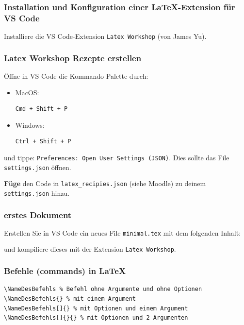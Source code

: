 \begin{frame}[fragile]
	\frametitle{Installation und Konfiguration einer \LaTeX-Extension für VS Code}
	Installiere die VS Code-Extension \texttt{Latex Workshop} (von James Yu).
\end{frame}

\begin{frame}[fragile]
	\frametitle{Latex Workshop Rezepte erstellen}
	Öffne in VS Code die Kommando-Palette durch:
\begin{itemize}[<+->]
    \item MacOS:
\begin{lstlisting}[language=bash, numbers=none]
Cmd + Shift + P
\end{lstlisting}
\item Windows:
\begin{lstlisting}[language=bash, numbers=none]
Ctrl + Shift + P
\end{lstlisting}
\end{itemize}
und tippe: \texttt{Preferences: Open User Settings (JSON)}. Dies sollte das File \texttt{settings.json} öffnen.

\textbf{Füge} den Code in \texttt{latex\_recipies.json} (siehe Moodle) zu deinem \texttt{settings.json} hinzu.
\end{frame}

\begin{frame}[fragile]
\frametitle{erstes Dokument}
	    Erstellen Sie in VS Code ein neues File \texttt{minimal.tex} mit dem folgenden Inhalt:
		
	        
		und kompiliere dieses mit der Extension \texttt{Latex Workshop}.
\end{frame}

\begin{frame}[fragile]
\frametitle{Befehle (commands) in \LaTeX}
\begin{lstlisting}[style=LaTeX,basicstyle=\footnotesize\ttfamily]
\NameDesBefehls % Befehl ohne Argumente und ohne Optionen
\NameDesBefehls{} % mit einem Argument
\NameDesBefehls[]{} % mit Optionen und einem Argument
\NameDesBefehls[]{}{} % mit Optionen und 2 Argumenten
\end{lstlisting}
\end{frame}

